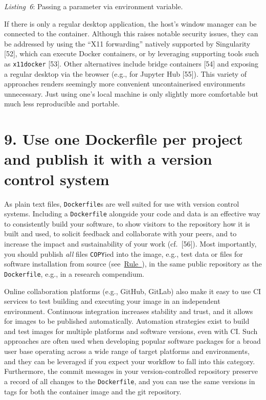 \documentclass[10pt,letterpaper]{article}
\begin{document}
\emph{Listing~6}: Passing a parameter via environment variable.

\normalsize

If there is only a regular desktop application, the host's window
manager can be connected to the container. Although this raises notable
security issues, they can be addressed by using the ``X11 forwarding''
natively supported by Singularity {[}52{]}, which can execute Docker
containers, or by leveraging supporting tools such as \texttt{x11docker}
{[}53{]}. Other alternatives include bridge containers {[}54{]} and
exposing a regular desktop via the browser (e.g., for Jupyter Hub
{[}55{]}). This variety of approaches renders seemingly more convenient
uncontainerised environments unnecessary. Just using one's local machine
is only slightly more comfortable but much less reproducible and
portable.

\hypertarget{use-one-dockerfile-per-project-and-publish-it-with-a-version-control-system}{%
\section*{9. Use one Dockerfile per project and publish it with a
version control
system}\label{use-one-dockerfile-per-project-and-publish-it-with-a-version-control-system}}

  \label{rule:publish} 

As plain text files, \texttt{Dockerfile}s are well suited for use with
version control systems. Including a \texttt{Dockerfile} alongside your
code and data is an effective way to consistently build your software,
to show visitors to the repository how it is built and used, to solicit
feedback and collaborate with your peers, and to increase the impact and
sustainability of your work (cf.~{[}56{]}). Most importantly, you should
publish \emph{all} files \texttt{COPY}ied into the image, e.g., test
data or files for software installation from source
(see~\hyperref[{rule:mount}]{Rule~}), in the same
public repository as the \texttt{Dockerfile}, e.g., in a research
compendium.

Online collaboration platforms (e.g., GitHub, GitLab) also make it easy
to use CI services to test building and executing your image in an
independent environment. Continuous integration increases stability and
trust, and it allows for images to be published automatically.
Automation strategies exist to build and test images for multiple
platforms and software versions, even with CI. Such approaches are often
used when developing popular software packages for a broad user base
operating across a wide range of target platforms and environments, and
they can be leveraged if you expect your workflow to fall into this
category. Furthermore, the commit messages in your version-controlled
repository preserve a record of all changes to the \texttt{Dockerfile},
and you can use the same versions in tags for both the container image
and the git repository.
\end{document}
